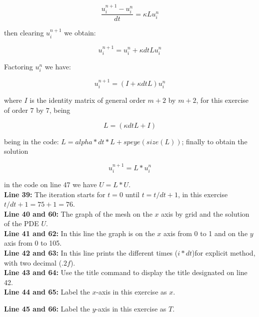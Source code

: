 \begin{equation}
    \frac{u^{n+1}_{i} - u^{n}_{i} }{dt} = \kappa L 	u^{n}_{i}
\end{equation}

then clearing $u^{n+1}_{i}$ we obtain:


\begin{equation}
    u^{n+1}_{i} = u^{n}_{i}  +  \kappa dt L u^{n}_{i}
\end{equation}

Factoring $u^{n}_{i}$ we have:

\begin{equation}
    u^{n+1}_{i} = (I  +  \kappa dt L )u^{n}_{i}
\end{equation}

where $I$ is the identity matrix of general order $m+2$ by $m+2$, for this exercise of order $7$ by $7$, being

$$  L = (\kappa dt L +I )$$

being in the code: $ L = alpha*dt*L + speye(size(L))$; finally to obtain the solution

\begin{equation}
    u^{n+1}_{i} = L *u^{n}_{i}
\end{equation}

in the code on line 47 we have $ U = L*U.$\\


\textbf{Line 39:} The iteration starts for $t=0$ until $t=t/dt+1$, in this exercise $t/dt+1= 75+1=76$.\\


\textbf{Line 40 and 60:} The graph of the mesh on the $x$ axis by grid and the solution of the PDE $U$. \\


\textbf{Line 41 and 62:} In this line the graph is on the $x$ axis from 0 to 1 and on the $y$ axis from 0 to 105.\\


\textbf{Line 42 and 63:} In this line prints the different times ($ i* dt$)for explicit method, with two decimal  ($ .2f $).\\


\textbf{Line 43 and 64:} Use the title command to display the title designated on line 42. \\


\textbf{Line 44 and 65:} Label the $x$-axis in this exercise as $x$.


\textbf{Line 45 and 66:} Label the $y$-axis in this exercise as $T$.\\


